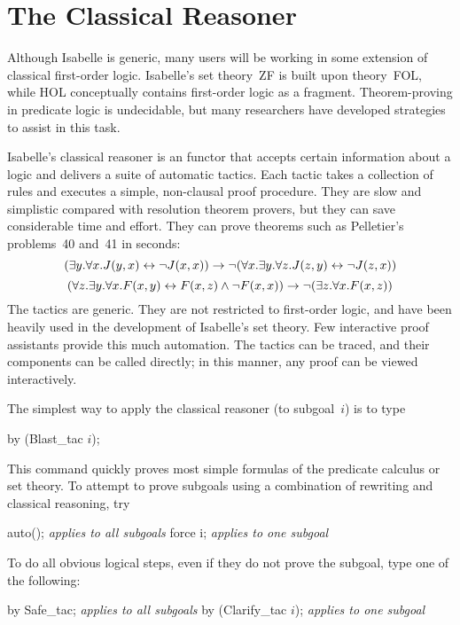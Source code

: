 \chapter{The Classical Reasoner}\label{chap:classical}
\newcommand\ainfer[2]{\begin{array}{r@{\,}l}#2\\ \hline#1\end{array}}

Although Isabelle is generic, many users will be working in some extension of
classical first-order logic.  Isabelle's set theory~ZF is built upon
theory~FOL, while HOL conceptually contains first-order logic as a fragment.
Theorem-proving in predicate logic is undecidable, but many researchers have
developed strategies to assist in this task.

Isabelle's classical reasoner is an \ML{} functor that accepts certain
information about a logic and delivers a suite of automatic tactics.  Each
tactic takes a collection of rules and executes a simple, non-clausal proof
procedure.  They are slow and simplistic compared with resolution theorem
provers, but they can save considerable time and effort.  They can prove
theorems such as Pelletier's~\cite{pelletier86} problems~40 and~41 in
seconds:
\[ (\exists y. \forall x. J(y,x) \leftrightarrow \neg J(x,x))  
   \rightarrow  \neg (\forall x. \exists y. \forall z. J(z,y) \leftrightarrow \neg J(z,x)) \]
\[ (\forall z. \exists y. \forall x. F(x,y) \leftrightarrow F(x,z) \wedge \neg F(x,x))
   \rightarrow \neg (\exists z. \forall x. F(x,z))  
\]
%
The tactics are generic.  They are not restricted to first-order logic, and
have been heavily used in the development of Isabelle's set theory.  Few
interactive proof assistants provide this much automation.  The tactics can
be traced, and their components can be called directly; in this manner,
any proof can be viewed interactively.

The simplest way to apply the classical reasoner (to subgoal~$i$) is to type
\begin{ttbox}
by (Blast_tac \(i\));
\end{ttbox}
This command quickly proves most simple formulas of the predicate calculus or
set theory.  To attempt to prove subgoals using a combination of
rewriting and classical reasoning, try
\begin{ttbox}
auto();                         \emph{\textrm{applies to all subgoals}}
force i;                        \emph{\textrm{applies to one subgoal}}
\end{ttbox}
To do all obvious logical steps, even if they do not prove the
subgoal, type one of the following:
\begin{ttbox}
by Safe_tac;                   \emph{\textrm{applies to all subgoals}}
by (Clarify_tac \(i\));            \emph{\textrm{applies to one subgoal}}
\end{ttbox}


